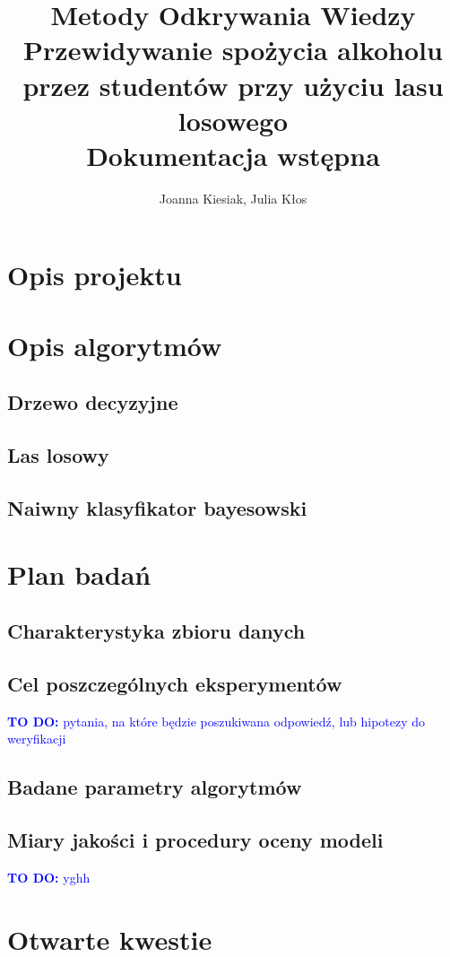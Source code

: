 \documentclass{article}
\title{{\normalfont Metody Odkrywania Wiedzy}\vspace{0.2cm} \\ 
Przewidywanie spożycia alkoholu przez studentów przy użyciu lasu losowego\\
\vspace{0.2cm}
\large{\normalfont Dokumentacja wstępna}}
\author{
Joanna Kiesiak, Julia Kłos\\

}
\newcommand{\todo}[1]{\textcolor{blue}{\textbf{TO DO:} #1}}
\begin{document}
\maketitle

\section{Opis projektu}

\section{Opis algorytmów}
\subsection{Drzewo decyzyjne}

\subsection{Las losowy}

\subsection{Naiwny klasyfikator bayesowski}

\section{Plan badań}
\subsection{Charakterystyka zbioru danych}

\subsection{Cel poszczególnych eksperymentów}
\todo{pytania, na które będzie poszukiwana odpowiedź, lub hipotezy do weryfikacji}
\subsection{Badane parametry algorytmów}


\subsection{Miary jakości i procedury oceny modeli}

\todo{yghh}
\section{Otwarte kwestie}


\end{document}

